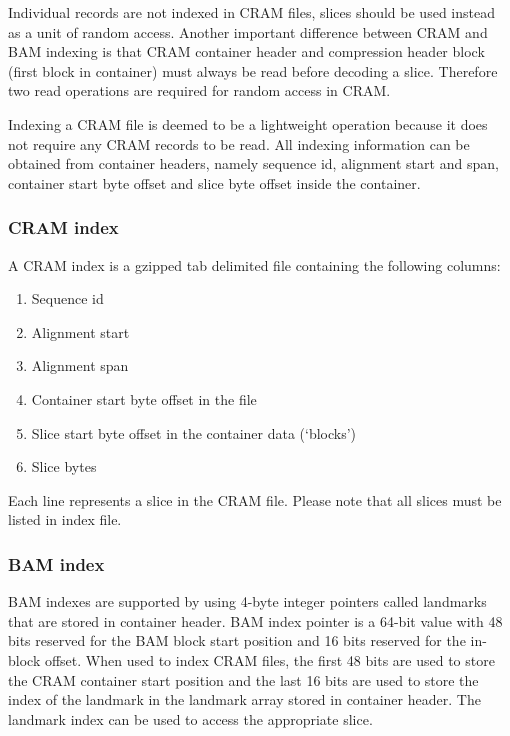 \documentclass[a4paper]{article}
\begin{document}
Individual records are not indexed in CRAM files, slices should be used instead 
as a unit of random access. Another important difference between CRAM and BAM indexing 
is that CRAM container header and compression header block (first block in container) 
must always be read before decoding a slice. Therefore two read operations are 
required for random access in CRAM.

Indexing a CRAM file is deemed to be a lightweight operation because it does not 
require any CRAM records to be read. All indexing information can be obtained from 
container headers, namely sequence id, alignment start and span, container start 
byte offset and slice byte offset inside the container. 

\subsubsection*{CRAM index}

A CRAM index is a gzipped tab delimited file containing the following columns:

\begin{enumerate}
\item Sequence id

\item Alignment start

\item Alignment span

\item Container start byte offset in the file

\item Slice start byte offset in the container data (`blocks')

\item Slice bytes
\end{enumerate}

Each line represents a slice in the CRAM file. Please note that all slices must 
be listed in index file.

\subsubsection*{BAM index}

BAM indexes are supported by using 4-byte integer pointers called landmarks that 
are stored in container header. BAM index pointer is a 64-bit value with 48 bits 
reserved for the BAM block start position and 16 bits reserved for the in-block 
offset. When used to index CRAM files, the first 48 bits are used to store the 
CRAM container start position and the last 16 bits are used to store the index 
of the landmark in the landmark array stored in  container header. The landmark 
index can be used to access the appropriate slice. 
\end{document}
